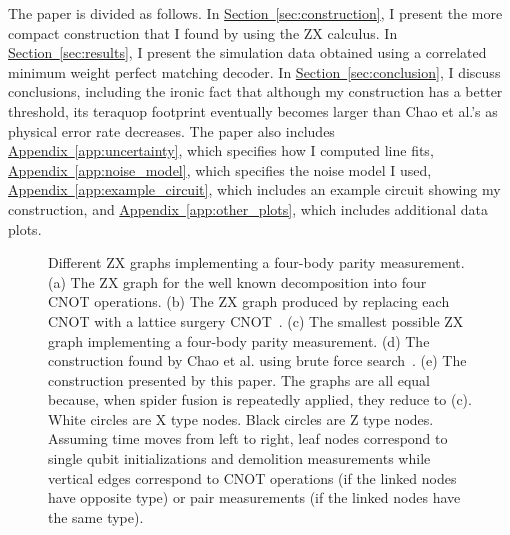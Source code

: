 \documentclass[onecolumn,unpublished,a4paper]{quantumarticle}
\theoremstyle{definition}
\theoremstyle{definition}
\theoremstyle{definition}
\renewcommand{\sec}[1]{\hyperref[sec:#1]{Section~\ref*{sec:#1}}}
\DeclareRobustCommand{\app}[1]{\hyperref[app:#1]{Appendix~\ref*{app:#1}}}
\begin{document}
The paper is divided as follows.
In \sec{construction}, I present the more compact construction that I found by using the ZX calculus.
In \sec{results}, I present the simulation data obtained using a correlated minimum weight perfect matching decoder.
In \sec{conclusion}, I discuss conclusions, including the ironic fact that although  my construction has a better threshold, its teraquop footprint eventually becomes larger than Chao et al.'s as physical error rate decreases.
The paper also includes \app{uncertainty}, which specifies how I computed line fits, \app{noise_model}, which specifies the noise model I used, \app{example_circuit}, which includes an example circuit showing my construction, and \app{other_plots}, which includes additional data plots.

\begin{figure}
    \centering
    \caption{
        Different ZX graphs implementing a four-body parity measurement.
        (a) The ZX graph for the well known decomposition into four CNOT operations.
        (b) The ZX graph produced by replacing each CNOT with a lattice surgery CNOT~\cite{horsman2012latticesurgery}.
        (c) The smallest possible ZX graph implementing a four-body parity measurement.
        (d) The construction found by Chao et al. using brute force search~\cite{chao2020optimization}.
        (e) The construction presented by this paper.
        The graphs are all equal because, when spider fusion is repeatedly applied, they reduce to (c).
        White circles are X type nodes.
        Black circles are Z type nodes.
        Assuming time moves from left to right, leaf nodes correspond to single qubit initializations and demolition measurements while vertical edges correspond to CNOT operations (if the linked nodes have opposite type) or pair measurements (if the linked nodes have the same type).
    }
    \label{fig:zx_identities}
\end{figure}
\end{document}
